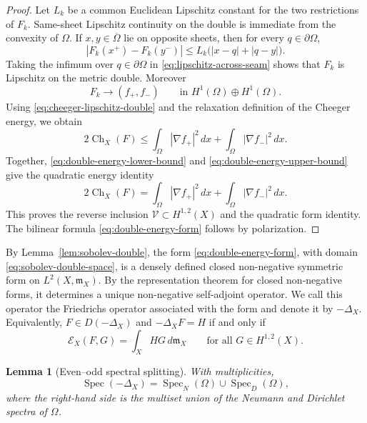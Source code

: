 \documentclass[11pt]{amsart}
\newtheorem{lemma}[theorem]{Lemma}
\numberwithin{equation}{section}
\DeclareMathOperator{\Spec}{Spec}
\newcommand{\EE}{\mathcal E}
\newcommand{\Om}{\Omega}
\newcommand{\mm}{\mathfrak m}
\begin{document}
\begin{proof}
Let $L_k$ be a common Euclidean Lipschitz constant for the two restrictions of
$F_k$.  Same-sheet Lipschitz continuity on the double is immediate from the
convexity of $\Om$.  If $x,y\in\overline\Om$ lie on opposite sheets, then for
every $q\in\partial\Om$,
\begin{equation}\label{eq:lipschitz-across-seam}
|F_k(x^+)-F_k(y^-)|
\le
L_k\bigl(|x-q|+|q-y|\bigr).
\end{equation}
Taking the infimum over $q\in\partial\Om$ in
\eqref{eq:lipschitz-across-seam} shows that $F_k$ is Lipschitz on the metric
double.  Moreover
$$
F_k\to(f_+,f_-)
\qquad\text{in }H^1(\Om)\oplus H^1(\Om).
$$
Using \eqref{eq:cheeger-lipschitz-double} and the relaxation definition of the
Cheeger energy, we obtain
\begin{equation}\label{eq:double-energy-upper-bound}
2\operatorname{Ch}_X(F)
\le
\int_\Om |\nabla f_+|^2\,dx+
\int_\Om |\nabla f_-|^2\,dx .
\end{equation}
Together, \eqref{eq:double-energy-lower-bound} and
\eqref{eq:double-energy-upper-bound} give the quadratic energy identity
$$
2\operatorname{Ch}_X(F)=
\int_\Om |\nabla f_+|^2\,dx+
\int_\Om |\nabla f_-|^2\,dx .
$$
This proves the reverse inclusion $\mathcal V\subset H^{1,2}(X)$ and the
quadratic form identity.  The bilinear formula
\eqref{eq:double-energy-form} follows by polarization.
\end{proof}

By Lemma~\ref{lem:sobolev-double}, the form
\eqref{eq:double-energy-form}, with domain
\eqref{eq:sobolev-double-space}, is a densely defined closed non-negative
symmetric form on $L^2(X,\mm_X)$.  By the representation theorem for closed
non-negative forms, it determines a unique non-negative self-adjoint operator.
We call this operator the Friedrichs operator associated with the form and denote
it by $-\Delta_X$.  Equivalently, $F\in D(-\Delta_X)$ and $-\Delta_XF=H$ if and
only if
$$
\EE_X(F,G)=\int_X H G\,d\mm_X
\qquad
\text{for all }G\in H^{1,2}(X).
$$


\begin{lemma}[Even--odd spectral splitting]\label{lem:splitting}
With multiplicities,
\begin{equation}\label{eq:spectral-splitting}
\Spec(-\Delta_X)=\Spec_N(\Om)\cup \Spec_D(\Om),
\end{equation}
where the right-hand side is the multiset union of the Neumann and Dirichlet
spectra of $\Om$.
\end{lemma}
\end{document}
